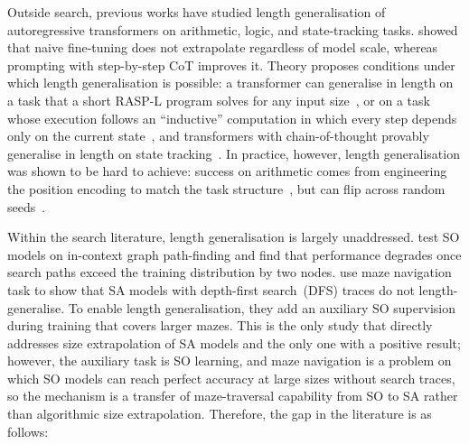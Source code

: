 Outside search, previous works have studied length generalisation of autoregressive transformers on arithmetic, logic, and state-tracking tasks.
\citet{anilExploringLengthGeneralization} showed that naive fine-tuning does not extrapolate regardless of model scale, whereas prompting with step-by-step CoT improves it.
Theory proposes conditions under which length generalisation is possible: a transformer can generalise in length on a task that a short RASP-L program solves for any input size~\citep{zhouWhatAlgorithmsCan2023,weissThinkingTransformers2021}, or on a task whose execution follows an ``inductive'' computation in which every step depends only on the current state~\citep{houUniversalLengthGeneralization2024,abbeHowFarCan2024}, and transformers with chain-of-thought provably generalise in length on state tracking~\citep{huangTransformersProvablyLearn2025}.
In practice, however, length generalisation was shown to be hard to achieve: success on arithmetic comes from engineering the position encoding to match the task structure~\citep{kazemnejadNoPE2023,mcleishAbacus2024,choPositionCoupling2024}, but can flip across random seeds~\citep{zhouTransformersCanAchieve2024}.

Within the search literature, length generalisation is largely unaddressed.
\citet{saparovTransformersStruggleLearn2025} test SO models on in-context graph path-finding and find that performance degrades once search paths exceed the training distribution by two nodes.
\citet{caiExtrapolationAssociationLength2025} use maze navigation task to show that SA models with depth-first search~(DFS) traces do not length-generalise.
To enable length generalisation, they add an auxiliary SO supervision during training that covers larger mazes.
This is the only study that directly addresses size extrapolation of SA models and the only one with a positive result; however, the auxiliary task is SO learning, and maze navigation is a problem on which SO models can reach perfect accuracy at large sizes without search traces, so the mechanism is a transfer of maze-traversal capability from SO to SA rather than algorithmic size extrapolation.
Therefore, the gap in the literature is as follows:

